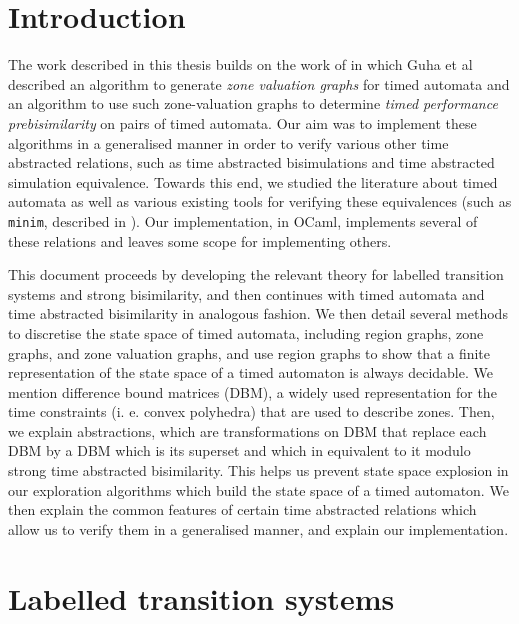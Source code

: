 \documentclass[a4paper]{llncs}
\begin{document}
\tableofcontents
\pagebreak
\listoffigures
\listoftables
\pagebreak

\section{Introduction}

The work described in this thesis builds on the work of
\cite{DBLP:conf/cav/GuhaNA12} in which Guha et al described an
algorithm to generate \emph{zone valuation graphs} for timed automata
and an algorithm to use such zone-valuation graphs to determine
\emph{timed performance prebisimilarity} on pairs of timed
automata. Our aim was to implement these algorithms in a generalised
manner in order to verify various other time abstracted relations,
such as time abstracted bisimulations \cite{tripakis2001analysis} and
time abstracted simulation equivalence. Towards
this end, we studied the literature about timed automata as well as
various existing tools for verifying these
equivalences (such as \texttt{minim}, described in
\cite{tripakis2001analysis}). Our implementation, in OCaml, implements
several of these relations and leaves some scope for implementing
others.

This document proceeds by developing the relevant theory for labelled transition
systems and strong bisimilarity, and then continues with timed
automata and time abstracted bisimilarity in analogous fashion. We 
then detail several methods to discretise the state space of timed
automata, including region graphs, zone graphs, and zone valuation
graphs, and use region graphs to show that a finite representation of
the state space of a timed automaton is always decidable. We mention
difference bound matrices (DBM), a widely used representation for the time
constraints (i. e. convex polyhedra) that are used to describe
zones. Then, we explain abstractions, which are transformations on DBM
that replace each DBM by a DBM which is its superset and
which in equivalent to it modulo strong time abstracted
bisimilarity. This helps us prevent state space explosion in our
exploration algorithms which build the state space of a timed
automaton. We then explain the common features of certain time
abstracted relations which allow us to verify them in a generalised
manner, and explain our implementation.


\section{Labelled transition systems}
\end{document}
